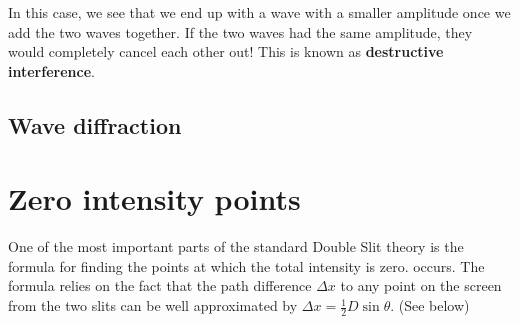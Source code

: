 \documentclass{paper}
\begin{document}
In this case, we see that we  end up with a wave with a smaller amplitude once we add the two waves together. If the two waves had the same amplitude, they would completely cancel each other out! This is known as \textbf{destructive interference}.

\subsection{Wave diffraction}



\section{Zero intensity points}
\label{section:zero-intensity}

One of the most important parts of the standard Double Slit theory is
the formula for finding the points at which the total intensity is zero.
occurs. The formula relies on the fact that the path difference $\Delta{x}$ to any point on
the screen from the two slits can be well approximated by $\Delta{x} = \frac{1}{2}D\sin{\theta}$. (See  below)
\end{document}
